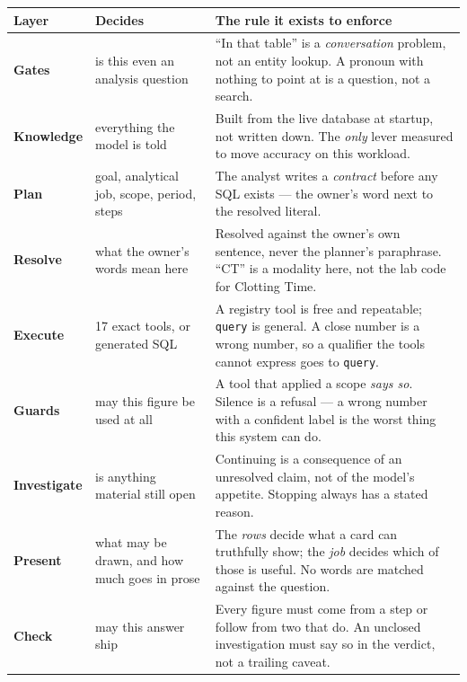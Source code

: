 \documentclass[10pt,a4paper]{article}
\newcommand{\code}[1]{\texttt{\small #1}}
\begin{document}
{\footnotesize
\begin{tabular}{@{}p{2.1cm}p{5.6cm}p{10.2cm}@{}}
\toprule
\textbf{Layer} & \textbf{Decides} & \textbf{The rule it exists to enforce}\\
\midrule
\textbf{Gates} & is this even an analysis question & ``In that table'' is a \emph{conversation} problem, not an
 entity lookup. A pronoun with nothing to point at is a question, not a search.\\
\textbf{Knowledge} & everything the model is told & Built from the live database at startup, not written down. The
 \emph{only} lever measured to move accuracy on this workload.\\
\textbf{Plan} & goal, analytical job, scope, period, steps & The analyst writes a \emph{contract} before any SQL
 exists --- the owner's word next to the resolved literal.\\
\textbf{Resolve} & what the owner's words mean here & Resolved against the owner's own sentence, never the
 planner's paraphrase. ``CT'' is a modality here, not the lab code for Clotting Time.\\
\textbf{Execute} & 17 exact tools, or generated SQL & A registry tool is free and repeatable; \code{query} is
 general. A close number is a wrong number, so a qualifier the tools cannot express goes to \code{query}.\\
\textbf{Guards} & may this figure be used at all & A tool that applied a scope \emph{says so}. Silence is a refusal ---
 a wrong number with a confident label is the worst thing this system can do.\\
\textbf{Investigate} & is anything material still open & Continuing is a consequence of an unresolved claim, not of
 the model's appetite. Stopping always has a stated reason.\\
\textbf{Present} & what may be drawn, and how much goes in prose & The \emph{rows} decide what a card can
 truthfully show; the \emph{job} decides which of those is useful. No words are matched against the question.\\
\textbf{Check} & may this answer ship & Every figure must come from a step or follow from two that do. An
 unclosed investigation must say so in the verdict, not a trailing caveat.\\
\bottomrule
\end{tabular}}
\end{document}
